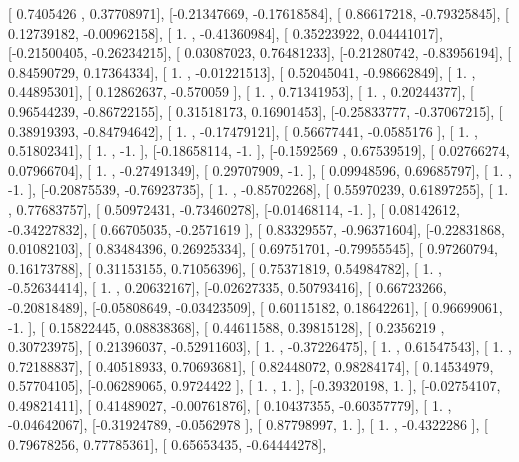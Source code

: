 \documentclass{article}
\begin{document}
       [ 0.7405426 ,  0.37708971],
       [-0.21347669, -0.17618584],
       [ 0.86617218, -0.79325845],
       [ 0.12739182, -0.00962158],
       [ 1.        , -0.41360984],
       [ 0.35223922,  0.04441017],
       [-0.21500405, -0.26234215],
       [ 0.03087023,  0.76481233],
       [-0.21280742, -0.83956194],
       [ 0.84590729,  0.17364334],
       [ 1.        , -0.01221513],
       [ 0.52045041, -0.98662849],
       [ 1.        ,  0.44895301],
       [ 0.12862637, -0.570059  ],
       [ 1.        ,  0.71341953],
       [ 1.        ,  0.20244377],
       [ 0.96544239, -0.86722155],
       [ 0.31518173,  0.16901453],
       [-0.25833777, -0.37067215],
       [ 0.38919393, -0.84794642],
       [ 1.        , -0.17479121],
       [ 0.56677441, -0.0585176 ],
       [ 1.        ,  0.51802341],
       [ 1.        , -1.        ],
       [-0.18658114, -1.        ],
       [-0.1592569 ,  0.67539519],
       [ 0.02766274,  0.07966704],
       [ 1.        , -0.27491349],
       [ 0.29707909, -1.        ],
       [ 0.09948596,  0.69685797],
       [ 1.        , -1.        ],
       [-0.20875539, -0.76923735],
       [ 1.        , -0.85702268],
       [ 0.55970239,  0.61897255],
       [ 1.        ,  0.77683757],
       [ 0.50972431, -0.73460278],
       [-0.01468114, -1.        ],
       [ 0.08142612, -0.34227832],
       [ 0.66705035, -0.2571619 ],
       [ 0.83329557, -0.96371604],
       [-0.22831868,  0.01082103],
       [ 0.83484396,  0.26925334],
       [ 0.69751701, -0.79955545],
       [ 0.97260794,  0.16173788],
       [ 0.31153155,  0.71056396],
       [ 0.75371819,  0.54984782],
       [ 1.        , -0.52634414],
       [ 1.        ,  0.20632167],
       [-0.02627335,  0.50793416],
       [ 0.66723266, -0.20818489],
       [-0.05808649, -0.03423509],
       [ 0.60115182,  0.18642261],
       [ 0.96699061, -1.        ],
       [ 0.15822445,  0.08838368],
       [ 0.44611588,  0.39815128],
       [ 0.2356219 ,  0.30723975],
       [ 0.21396037, -0.52911603],
       [ 1.        , -0.37226475],
       [ 1.        ,  0.61547543],
       [ 1.        ,  0.72188837],
       [ 0.40518933,  0.70693681],
       [ 0.82448072,  0.98284174],
       [ 0.14534979,  0.57704105],
       [-0.06289065,  0.9724422 ],
       [ 1.        ,  1.        ],
       [-0.39320198,  1.        ],
       [-0.02754107,  0.49821411],
       [ 0.41489027, -0.00761876],
       [ 0.10437355, -0.60357779],
       [ 1.        , -0.04642067],
       [-0.31924789, -0.0562978 ],
       [ 0.87798997,  1.        ],
       [ 1.        , -0.4322286 ],
       [ 0.79678256,  0.77785361],
       [ 0.65653435, -0.64444278],
\end{document}
